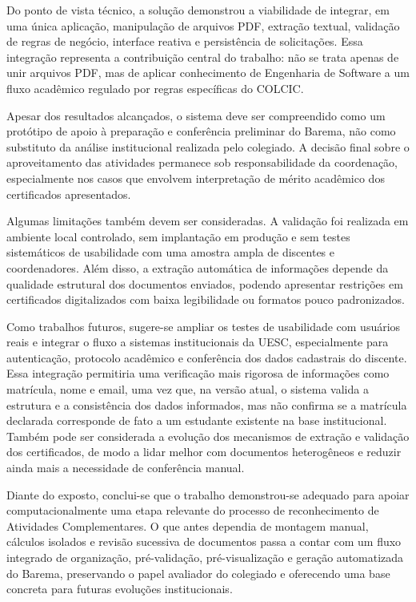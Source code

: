 Do ponto de vista técnico, a solução demonstrou a viabilidade de integrar, em uma única aplicação, manipulação de arquivos PDF, extração textual, validação de regras de negócio, interface reativa e persistência de solicitações. Essa integração representa a contribuição central do trabalho: não se trata apenas de unir arquivos PDF, mas de aplicar conhecimento de Engenharia de Software a um fluxo acadêmico regulado por regras específicas do COLCIC.

Apesar dos resultados alcançados, o sistema deve ser compreendido como um protótipo de apoio à preparação e conferência preliminar do Barema, não como substituto da análise institucional realizada pelo colegiado. A decisão final sobre o aproveitamento das atividades permanece sob responsabilidade da coordenação, especialmente nos casos que envolvem interpretação de mérito acadêmico dos certificados apresentados.

Algumas limitações também devem ser consideradas. A validação foi realizada em ambiente local controlado, sem implantação em produção e sem testes sistemáticos de usabilidade com uma amostra ampla de discentes e coordenadores. Além disso, a extração automática de informações depende da qualidade estrutural dos documentos enviados, podendo apresentar restrições em certificados digitalizados com baixa legibilidade ou formatos pouco padronizados.

Como trabalhos futuros, sugere-se ampliar os testes de usabilidade com usuários reais e integrar o fluxo a sistemas institucionais da UESC, especialmente para autenticação, protocolo acadêmico e conferência dos dados cadastrais do discente. Essa integração permitiria uma verificação mais rigorosa de informações como matrícula, nome e email, uma vez que, na versão atual, o sistema valida a estrutura e a consistência dos dados informados, mas não confirma se a matrícula declarada corresponde de fato a um estudante existente na base institucional. Também pode ser considerada a evolução dos mecanismos de extração e validação dos certificados, de modo a lidar melhor com documentos heterogêneos e reduzir ainda mais a necessidade de conferência manual.

Diante do exposto, conclui-se que o trabalho demonstrou-se adequado para apoiar computacionalmente uma etapa relevante do processo de reconhecimento de Atividades Complementares. O que antes dependia de montagem manual, cálculos isolados e revisão sucessiva de documentos passa a contar com um fluxo integrado de organização, pré-validação, pré-visualização e geração automatizada do Barema, preservando o papel avaliador do colegiado e oferecendo uma base concreta para futuras evoluções institucionais.
